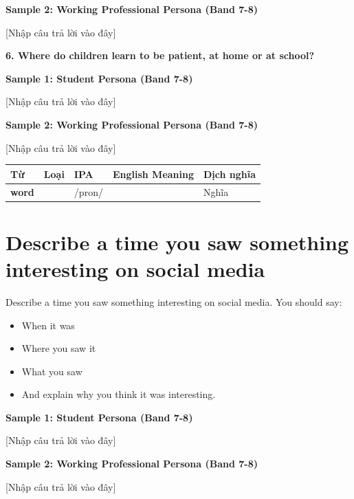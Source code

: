 \textbf{Sample 2: Working Professional Persona (Band 7-8)}

[Nhập câu trả lời vào đây]

\separator

\begin{ieltsquestion}
\textbf{6. Where do children learn to be patient, at home or at school?}
\end{ieltsquestion}
\textbf{Sample 1: Student Persona (Band 7-8)}

[Nhập câu trả lời vào đây]

\textbf{Sample 2: Working Professional Persona (Band 7-8)}

[Nhập câu trả lời vào đây]

\separator


\vspace{0.8em}
\begin{center}
\renewcommand{\arraystretch}{1.65}
\begin{tabularx}{\textwidth}{|V{0.22\textwidth}|C{0.07\textwidth}|I{0.20\textwidth}|Y|V{0.18\textwidth}|}
\hline
{}
\textbf{Từ} & \textbf{Loại} & \textbf{IPA} & \textbf{English Meaning} & \textbf{Dịch nghĩa} \\
\hline
\textbf{word} & & /pron/ & & Nghĩa \\ \hline
\end{tabularx}
\end{center}

\newpage

\section{Describe a time you saw something interesting on social media}
\begin{ieltsprompt}
Describe a time you saw something interesting on social media.
You should say:
\begin{itemize}[leftmargin=2em, itemsep=2pt]
\item When it was
\item Where you saw it
\item What you saw
\item And explain why you think it was interesting.
\end{itemize}
\end{ieltsprompt}
\begin{ieltsanswer}
\textbf{Sample 1: Student Persona (Band 7-8)}

[Nhập câu trả lời vào đây]

\textbf{Sample 2: Working Professional Persona (Band 7-8)}

[Nhập câu trả lời vào đây]
\end{ieltsanswer}


